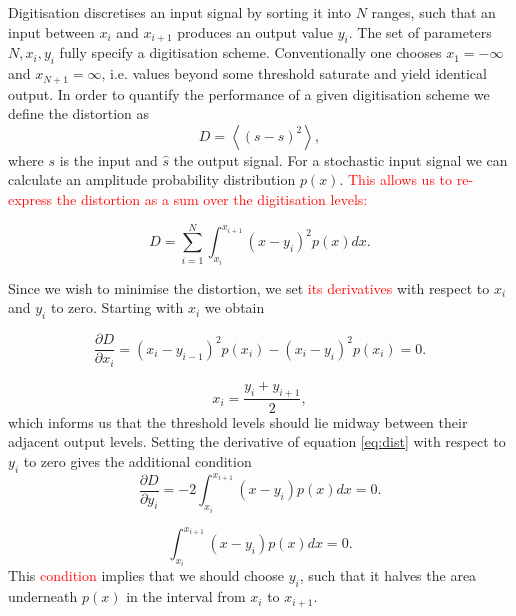 \documentclass[apj]{emulateapj}
\newcommand{\changed}[1]{\textcolor{Red}{#1}}
\begin{document}
Digitisation discretises an input signal by sorting it into $N$ ranges, such that an input between $x_i$ and $x_{i+1}$ produces an output value $y_i$. The set of parameters $N, x_i, y_i$ fully specify a digitisation scheme. Conventionally one chooses $x_{1} = -\infty$ and $x_{N+1} = \infty$, i.e. values beyond some threshold saturate and yield identical output. In order to quantify the performance of a given digitisation scheme we define the distortion as
\begin{equation}\label{eq:distdef}
D = \left\langle  \left( s - \hat{s} \right)^2 \right\rangle,
\end{equation}
where $s$ is the input and $\hat{s}$ the output signal. For a stochastic input signal we can calculate an amplitude probability distribution $p(x)$. \changed{This allows us to re-express the distortion as a sum over the digitisation levels:}

\begin{equation} \label{eq:dist}
D = \sum_{i = 1}^N \int_{x_i}^{x_{i+1}} \left(x-y_i\right)^2 p(x) dx.
\end{equation}

Since we wish to minimise the distortion, we set \changed{its derivatives} with respect to $x_i$ and $y_i$ to zero. Starting with $x_i$ we obtain

\begin{equation} \label{eq:distderiv1}
\frac{\partial D}{\partial x_i} = \left(x_i-y_{i-1}\right)^2 p(x_i) - \left(x_i - y_i\right)^2 p(x_i) = 0.
\end{equation}

\begin{equation} \label{eq:digitequalspacecondition}
x_i = \frac{y_i+y_{i+1}}{2},
\end{equation}
which informs us that the threshold levels should lie midway between their adjacent output levels. Setting the derivative of equation \ref{eq:dist} with respect to $y_i$  to zero gives the additional condition
\begin{equation} \label{eq:distderiv2}
\frac{\partial D}{\partial y_i} = -2 \int_{x_i}^{x_{i+1}} \left( x-y_i \right) p(x) dx = 0.
\end{equation}

\begin{equation} \label{eq:digitareacondition}
\int_{x_i}^{x_{i+1}} \left( x-y_i \right) p(x) dx = 0.
\end{equation}
This \changed{condition} implies that we should choose $y_i$, such that it halves the area underneath $p(x)$ in the interval from $x_i$ to $x_{i+1}$.
\end{document}
